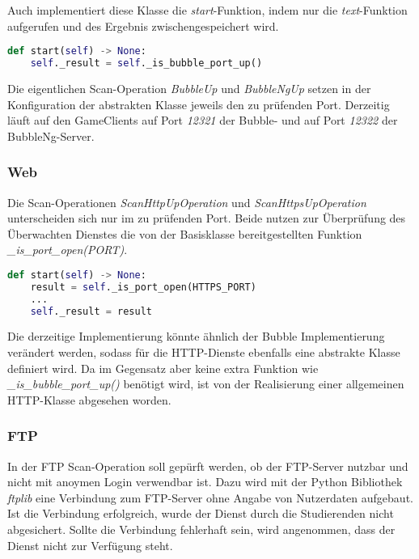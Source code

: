 Auch implementiert diese Klasse die \textit{start}-Funktion, indem nur die \textit{text}-Funktion aufgerufen und des Ergebnis zwischengespeichert wird.
\begin{lstlisting}[language=Python, frame=single, caption={Big Brother Bubble Scan-Operation}, captionpos=b, label={lst:bigbrother-host-up}]
def start(self) -> None:
	self._result = self._is_bubble_port_up()
\end{lstlisting} 

Die eigentlichen Scan-Operation \textit{BubbleUp} und \textit{BubbleNgUp} setzen in der Konfiguration der abstrakten Klasse jeweils den zu prüfenden Port. Derzeitig läuft auf den GameClients auf Port \textit{12321} der Bubble- und auf Port \textit{12322} der BubbleNg-Server.
\subsubsection{Web}

Die Scan-Operationen \textit{ScanHttpUpOperation} und \textit{ScanHttpsUpOperation} unterscheiden sich nur im zu prüfenden Port. Beide nutzen zur Überprüfung des Überwachten Dienstes die von der Basisklasse bereitgestellten Funktion \textit{\_is\_port\_open(PORT)}.

\begin{lstlisting}[language=Python, frame=single, caption={Big Brother HTTP(S) Scan-Operation}, captionpos=b, label={lst:bigbrother-http-up}]
def start(self) -> None:
	result = self._is_port_open(HTTPS_PORT)
	...
	self._result = result
\end{lstlisting} 

Die derzeitige Implementierung könnte ähnlich der Bubble Implementierung verändert werden, sodass für die HTTP-Dienste ebenfalls eine abstrakte Klasse definiert wird. Da im Gegensatz aber keine extra Funktion wie \textit{\_is\_bubble\_port\_up()} benötigt wird, ist von der Realisierung einer allgemeinen HTTP-Klasse abgesehen worden.

\subsubsection{FTP}
In der FTP Scan-Operation soll gepürft werden, ob der FTP-Server nutzbar und nicht mit anoymen Login verwendbar ist. Dazu wird mit der Python Bibliothek \textit{ftplib} eine Verbindung zum FTP-Server ohne Angabe von Nutzerdaten aufgebaut. Ist die Verbindung erfolgreich, wurde der Dienst durch die Studierenden nicht abgesichert. Sollte die Verbindung fehlerhaft sein, wird angenommen, dass der Dienst nicht zur Verfügung steht. 

